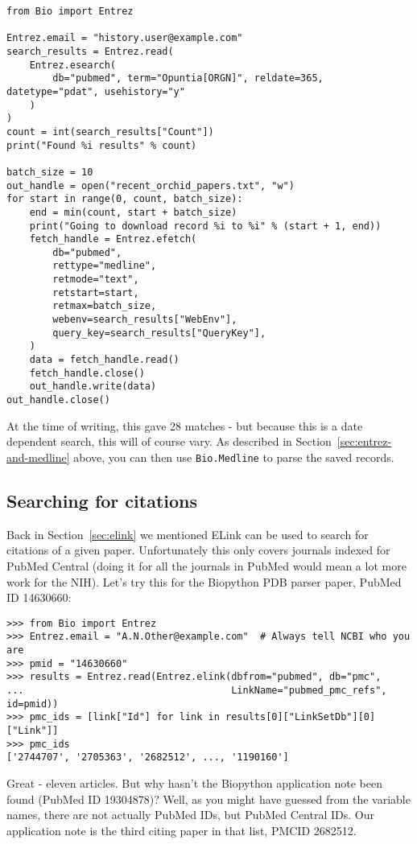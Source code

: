 \begin{verbatim}
from Bio import Entrez

Entrez.email = "history.user@example.com"
search_results = Entrez.read(
    Entrez.esearch(
        db="pubmed", term="Opuntia[ORGN]", reldate=365, datetype="pdat", usehistory="y"
    )
)
count = int(search_results["Count"])
print("Found %i results" % count)

batch_size = 10
out_handle = open("recent_orchid_papers.txt", "w")
for start in range(0, count, batch_size):
    end = min(count, start + batch_size)
    print("Going to download record %i to %i" % (start + 1, end))
    fetch_handle = Entrez.efetch(
        db="pubmed",
        rettype="medline",
        retmode="text",
        retstart=start,
        retmax=batch_size,
        webenv=search_results["WebEnv"],
        query_key=search_results["QueryKey"],
    )
    data = fetch_handle.read()
    fetch_handle.close()
    out_handle.write(data)
out_handle.close()
\end{verbatim}

\noindent At the time of writing, this gave 28 matches - but because this is a date dependent search, this will of course vary.  As described in Section~\ref{sec:entrez-and-medline} above, you can then use \verb|Bio.Medline| to parse the saved records.

\subsection{Searching for citations}
\label{sec:elink-citations}

Back in Section~\ref{sec:elink} we mentioned ELink can be used to search for citations of a given paper.
Unfortunately this only covers journals indexed for PubMed Central
(doing it for all the journals in PubMed would mean a lot more work for the NIH).
Let's try this for the Biopython PDB parser paper, PubMed ID 14630660:

\begin{verbatim}
>>> from Bio import Entrez
>>> Entrez.email = "A.N.Other@example.com"  # Always tell NCBI who you are
>>> pmid = "14630660"
>>> results = Entrez.read(Entrez.elink(dbfrom="pubmed", db="pmc",
...                                    LinkName="pubmed_pmc_refs", id=pmid))
>>> pmc_ids = [link["Id"] for link in results[0]["LinkSetDb"][0]["Link"]]
>>> pmc_ids
['2744707', '2705363', '2682512', ..., '1190160']
\end{verbatim}

Great - eleven articles. But why hasn't the Biopython application note been
found (PubMed ID 19304878)? Well, as you might have guessed from the variable
names, there are not actually PubMed IDs, but PubMed Central IDs. Our
application note is the third citing paper in that list, PMCID 2682512.

